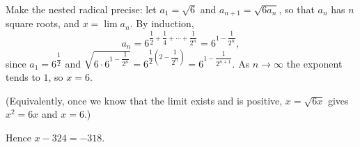 Make the nested radical precise: let $a_1=\sqrt6$ and $a_{n+1}=\sqrt{6a_n}$, so that $a_n$ has $n$ square roots, and $x=\lim a_n$. By induction,
\[a_n=6^{\dfrac12+\dfrac14+\cdots+\dfrac1{2^n}}=6^{1-\dfrac{1}{2^n}},\]
since $a_1=6^{\dfrac12}$ and $\sqrt{6\cdot6^{1-\dfrac1{2^n}}}=6^{\dfrac12\left(2-\dfrac1{2^n}\right)}=6^{1-\dfrac{1}{2^{n+1}}}$. As $n\to\infty$ the exponent tends to $1$, so $x=6$.

(Equivalently, once we know that the limit exists and is positive, $x=\sqrt{6x}$ gives $x^2=6x$ and $x=6$.)

Hence $x-324=\boxed{-318}$.
